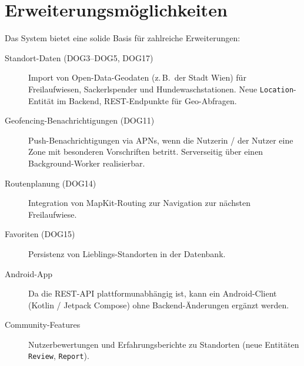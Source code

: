 \section{Erweiterungsmöglichkeiten}
\label{sec:erweiterungen}

Das System bietet eine solide Basis für zahlreiche Erweiterungen:

\begin{description}
  \item[Standort-Daten (DOG3–DOG5, DOG17)]
    Import von Open-Data-Geodaten (z.\,B.\ der Stadt Wien) für Freilaufwiesen,
    Sackerlspender und Hundewaschstationen. Neue \texttt{Location}-Entität im Backend,
    REST-Endpunkte für Geo-Abfragen.
  \item[Geofencing-Benachrichtigungen (DOG11)]
    Push-Benachrichtigungen via APNs, wenn die Nutzerin / der Nutzer eine Zone mit
    besonderen Vorschriften betritt. Serverseitig über einen Background-Worker realisierbar.
  \item[Routenplanung (DOG14)]
    Integration von MapKit-Routing zur Navigation zur nächsten Freilaufwiese.
  \item[Favoriten (DOG15)]
    Persistenz von Lieblings-Standorten in der Datenbank.
  \item[Android-App]
    Da die REST-API plattformunabhängig ist, kann ein Android-Client (Kotlin / Jetpack
    Compose) ohne Backend-Änderungen ergänzt werden.
  \item[Community-Features]
    Nutzerbewertungen und Erfahrungsberichte zu Standorten (neue Entitäten \texttt{Review},
    \texttt{Report}).
\end{description}
